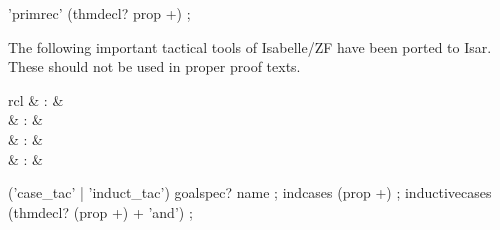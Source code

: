 \begin{isabellebody}
\begin{isamarkuptext}
  \begin{rail}
    'primrec' (thmdecl? prop +)
    ;
  \end{rail}%
\end{isamarkuptext}%
\isamarkuptrue%
%
\isamarkuptrue%
%
\begin{isamarkuptext}%
The following important tactical tools of Isabelle/ZF have been
  ported to Isar.  These should not be used in proper proof texts.

  \begin{matharray}{rcl}
    \mbox{}\isa{{\isachardoublequote}\isactrlsup {\isacharasterisk}{\isachardoublequote}} & : & \isarmeth \\
    \mbox{}\isa{{\isachardoublequote}\isactrlsup {\isacharasterisk}{\isachardoublequote}} & : & \isarmeth \\
    \mbox{}\isa{{\isachardoublequote}\isactrlsup {\isacharasterisk}{\isachardoublequote}} & : & \isarmeth \\
    \mbox{} & : &  \\
  \end{matharray}

  \begin{rail}
    ('case\_tac' | 'induct\_tac') goalspec? name
    ;
    indcases (prop +)
    ;
    inductivecases (thmdecl? (prop +) + 'and')
    ;
  \end{rail}%
\end{isamarkuptext}%
\isamarkuptrue%
%
\isadelimtheory
%
\endisadelimtheory
%
\isatagtheory
{}\isamarkupfalse%
%
\endisatagtheory
{\isafoldtheory}%
%
\isadelimtheory
%
\endisadelimtheory
\isanewline
\end{isabellebody}%
